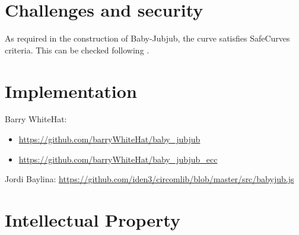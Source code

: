 \documentclass{article}
\begin{document}
\begin{spacing}{1.2}
\section{Challenges and security}	
	As required in the construction of Baby-Jubjub, the curve satisfies SafeCurves criteria. This can be checked following \cite{github-barry}.
	
\section{Implementation}		%
	Barry WhiteHat:	
	\begin{itemize}
		\item %
		\url{https://github.com/barryWhiteHat/baby_jubjub}
		\item \url{https://github.com/barryWhiteHat/baby_jubjub_ecc} 
	\end{itemize}
	Jordi Baylina: \url{https://github.com/iden3/circomlib/blob/master/src/babyjub.js}
	
\section {Intellectual Property}
	

	
	
\end{spacing}	
\end{document}
